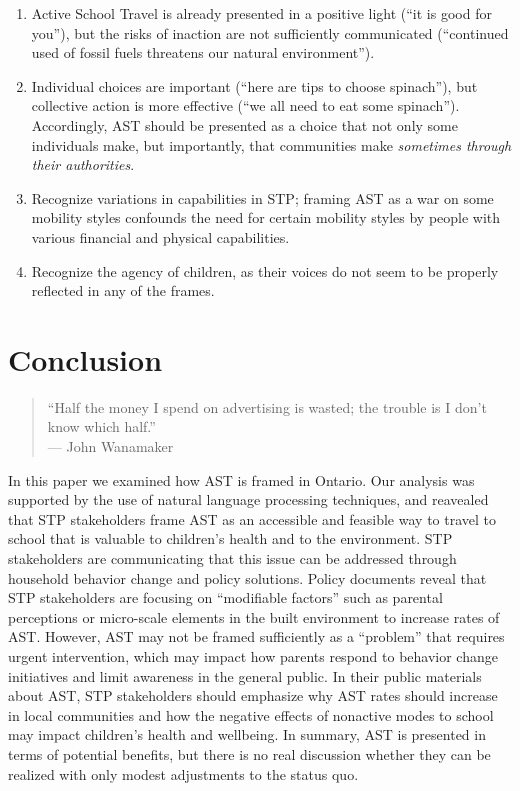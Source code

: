 \documentclass[preprint, 3p,
authoryear]{elsarticle} %
\providecommand{\tightlist}{%
  \setlength{\itemsep}{0pt}\setlength{\parskip}{0pt}}
\begin{document}
\begin{enumerate}
\def\labelenumi{\arabic{enumi}.}
\tightlist
\item
  Active School Travel is already presented in a positive light (``it is
  good for you''), but the risks of inaction are not sufficiently
  communicated (``continued used of fossil fuels threatens our natural
  environment'').
\item
  Individual choices are important (``here are tips to choose
  spinach''), but collective action is more effective (``we all need to
  eat some spinach''). Accordingly, AST should be presented as a choice
  that not only some individuals make, but importantly, that communities
  make \emph{sometimes through their authorities}.
\item
  Recognize variations in capabilities in STP; framing AST as a war on
  some mobility styles confounds the need for certain mobility styles by
  people with various financial and physical capabilities.
\item
  Recognize the agency of children, as their voices do not seem to be
  properly reflected in any of the frames.
\end{enumerate}

\hypertarget{conclusion}{%
\section{Conclusion}\label{conclusion}}

\begin{quote}
``Half the money I spend on advertising is wasted; the trouble is I
don't know which half.''\\
--- John Wanamaker
\end{quote}

In this paper we examined how AST is framed in Ontario. Our analysis was
supported by the use of natural language processing techniques, and
reavealed that STP stakeholders frame AST as an accessible and feasible
way to travel to school that is valuable to children's health and to the
environment. STP stakeholders are communicating that this issue can be
addressed through household behavior change and policy solutions. Policy
documents reveal that STP stakeholders are focusing on ``modifiable
factors'' such as parental perceptions or micro-scale elements in the
built environment to increase rates of AST. However, AST may not be
framed sufficiently as a ``problem'' that requires urgent intervention,
which may impact how parents respond to behavior change initiatives and
limit awareness in the general public. In their public materials about
AST, STP stakeholders should emphasize why AST rates should increase in
local communities and how the negative effects of nonactive modes to
school may impact children's health and wellbeing. In summary, AST is
presented in terms of potential benefits, but there is no real
discussion whether they can be realized with only modest adjustments to
the status quo.
\end{document}
